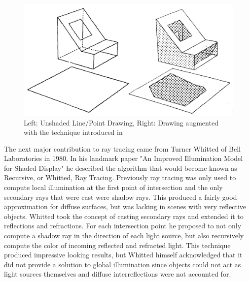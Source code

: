 \documentclass{ACGSeminar}
\begin{document}
\begin{figure}[htb!]
  \begin{centering}
    \includegraphics[width=12cm,natwidth=1233,natheight=661]{figures/Appel_Shading.png}\par
  \end{centering}
  \caption{Left: Unshaded Line/Point Drawing, Right: Drawing augmented with the technique introduced in \cite{Appel68}}
  \label{fig:appel_tracing}
\end{figure}

The next major contribution to ray tracing came from Turner Whitted of Bell Laboratories in 1980. In his landmark paper "An Improved Illumination Model for Shaded Display" \cite{Whitted:1980} he described the algorithm that would become known as Recursive, or Whitted, Ray Tracing. Previously ray tracing was only used to compute local illumination at the first point of intersection and the only secondary rays that were cast were shadow rays. This produced a fairly good approximation for diffuse surfaces, but was lacking in scenes with very reflective objects. Whitted took the concept of casting secondary rays and extended it to reflections and refractions. For each intersection point he proposed to not only compute a shadow ray in the direction of each light source, but also recursively compute the color of incoming reflected and refracted light. This technique produced impressive looking results, but Whitted himself acknowledged that it did not provide a solution to global illumination since objects could not act as light sources themselves and diffuse interreflections were not accounted for.
\end{document}
